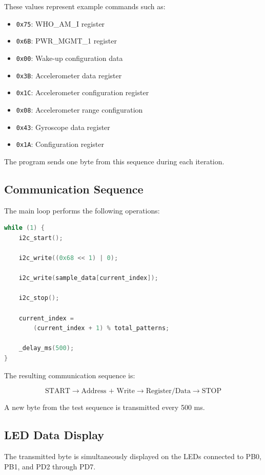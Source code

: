 \documentclass[12pt,a4paper]{article}
\begin{document}
These values represent example commands such as:

\begin{itemize}
    \item \texttt{0x75}: WHO\_AM\_I register
    \item \texttt{0x6B}: PWR\_MGMT\_1 register
    \item \texttt{0x00}: Wake-up configuration data
    \item \texttt{0x3B}: Accelerometer data register
    \item \texttt{0x1C}: Accelerometer configuration register
    \item \texttt{0x08}: Accelerometer range configuration
    \item \texttt{0x43}: Gyroscope data register
    \item \texttt{0x1A}: Configuration register
\end{itemize}

The program sends one byte from this sequence during each iteration.

\subsection{Communication Sequence}

The main loop performs the following operations:

\begin{lstlisting}[language=C]
while (1) {
    i2c_start();

    i2c_write((0x68 << 1) | 0);

    i2c_write(sample_data[current_index]);

    i2c_stop();

    current_index =
        (current_index + 1) % total_patterns;

    _delay_ms(500);
}
\end{lstlisting}

The resulting communication sequence is:

\[
\text{START}
\rightarrow
\text{Address + Write}
\rightarrow
\text{Register/Data}
\rightarrow
\text{STOP}
\]

A new byte from the test sequence is transmitted every 500 ms.

\subsection{LED Data Display}

The transmitted byte is simultaneously displayed on the LEDs connected
to PB0, PB1, and PD2 through PD7.
\end{document}
